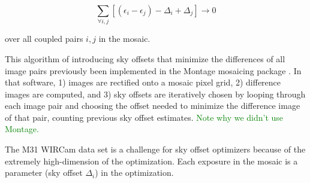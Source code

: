 \documentclass[iop]{emulateapj}
\newcommand{\todo}[1]{\textcolor{green}{#1}}
\begin{document}
\begin{equation}
    \sum_{\forall i,j} [(\epsilon_i - \epsilon_j) - \Delta_i + \Delta_j] \rightarrow 0
    \label{eq:scalartheoryobj}
\end{equation}

\noindent over all coupled pairs $i,j$ in the mosaic.

This algorithm of introducing sky offsets that minimize the differences of all image pairs previously been implemented in the Montage mosaicing package \citep{Berriman:2008}. In that software, 1) images are rectified onto a mosaic pixel grid, 2) difference images are computed, and 3) sky offsets are iteratively chosen by looping through each image pair and choosing the offset needed to minimize the difference image of that pair, counting previous sky offset estimates. \todo{Note why we didn't use Montage.}

The M31 WIRCam data set is a challenge for sky offset optimizers because of the extremely high-dimension of the optimization. Each exposure in the mosaic is a parameter (sky offset $\Delta_i$) in the optimization. 


\end{document}
